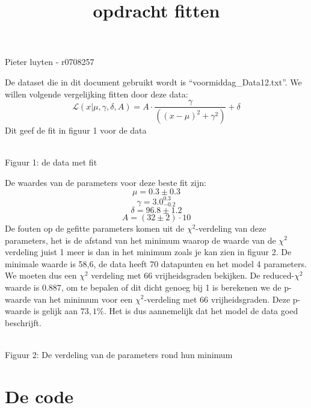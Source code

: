 \documentclass[11pt]{article}
\title{opdracht fitten}
\begin{document}
    
    
    \maketitle
    
    

    
\begin{center}
Pieter luyten - r0708257
\end{center}

    De dataset die in dit document gebruikt wordt is
``voormiddag\_Data12.txt''. We willen volgende vergelijking fitten door
deze data:
\[\mathcal{L}(x|\mu, \gamma, \delta, A) = A \cdot \frac{\gamma}{\left( \left(x-\mu \right)^2 + \gamma^2 \right)} + \delta\]
Dit geef de fit in figuur 1 voor de data

    \begin{center}
    \\
    Figuur 1: de data met fit
    \end{center}

    De waardes van de parameters voor deze beste fit zijn:
\[\mu = 0.3 \pm 0.3\] \[\gamma = 3.0_{-0.2}^{0.3}\]
\[\delta = 96.8 \pm 1.2\] \[A = (32 \pm 2) \cdot 10\] De fouten op de
gefitte parameters komen uit de \(\chi^2\)-verdeling van deze
parameters, het is de afstand van het minimum waarop de waarde van de
\(\chi^2\) verdeling juist 1 meer is dan in het minimum zoals je kan
zien in figuur 2. De minimale waarde is 58,6, de data heeft 70
datapunten en het model 4 parameters. We moeten dus een \(\chi^2\)
verdeling met 66 vrijheidsgraden bekijken. De reduced-\(\chi^2\) waarde
is \(0.887\), om te bepalen of dit dicht genoeg bij 1 is berekenen we de
p-waarde van het minimum voor een \(\chi^2\)-verdeling met 66
vrijheidsgraden. Deze p-waarde is gelijk aan \(73,1 \%\). Het is dus
aannemelijk dat het model de data goed beschrijft.

    \begin{center}
    \\
    Figuur 2: De verdeling van de parameters rond hun minimum
    \end{center}

\newpage

    \hypertarget{de-code}{%
\section{De code}\label{de-code}}
\end{document}
